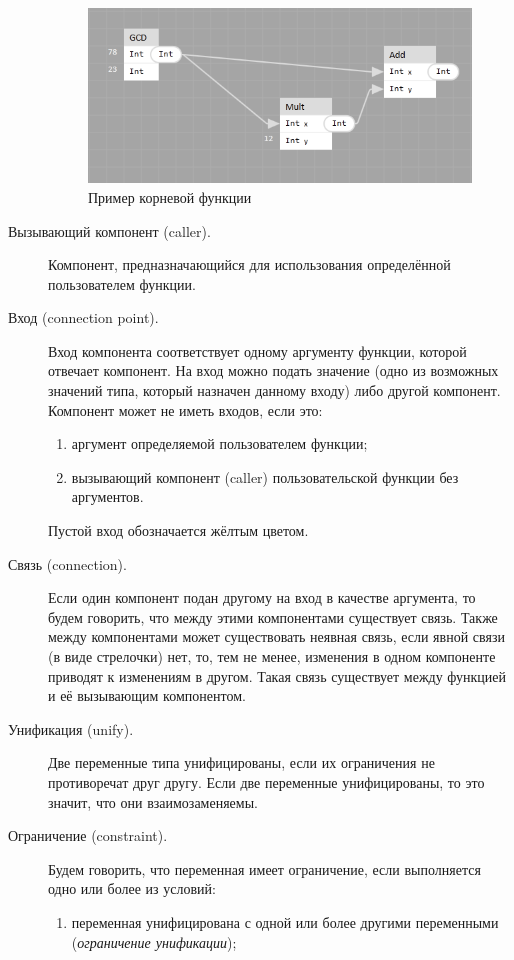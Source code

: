 \begin{description}
	\begin{figure}[h]
		\centering
		\includegraphics{img/core.PNG}
		\caption{Пример корневой функции}\label{corefun}	
	\end{figure}
	\item[Вызывающий компонент (caller).] Компонент, предназначающийся для использования определённой пользователем функции.
	\item[Вход (connection point).] Вход компонента соответствует одному аргументу функции, которой отвечает компонент. На вход можно подать значение (одно из возможных значений типа, который назначен данному входу) либо другой компонент. Компонент может не иметь входов, если это: 
	\begin{enumerate}[1)]
		\item аргумент определяемой пользователем функции;
		\item вызывающий компонент (caller) пользовательской функции без аргументов.
	\end{enumerate} 
	Пустой вход обозначается жёлтым цветом.
	\item[Связь (connection).] Если один компонент подан другому на вход в качестве аргумента, то будем говорить, что между этими компонентами существует связь. Также между компонентами может существовать неявная связь, если явной связи (в виде стрелочки) нет, то, тем не менее, изменения в одном компоненте приводят к изменениям в другом. Такая связь существует между функцией и её вызывающим компонентом.
	\item[Унификация (unify).] Две переменные типа унифицированы, если их ограничения не противоречат друг другу. Если две переменные унифицированы, то это значит, что они взаимозаменяемы.
	\item[Ограничение (constraint).] Будем говорить, что переменная имеет ограничение, если выполняется одно или более из условий:
		\begin{enumerate}[1)]
			\item переменная унифицирована с одной или более другими переменными (\textit{ограничение унификации});

\end{enumerate}
\end{description}
